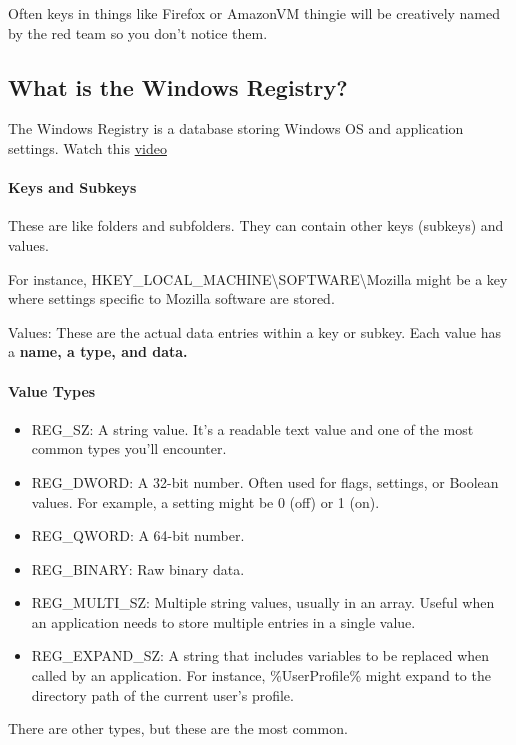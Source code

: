 \documentclass{article}
\begin{document}
Often keys in things like Firefox or AmazonVM thingie will be creatively named by the red team
so you don't notice them.

\subsection{What is the Windows Registry?}
The Windows Registry is a database storing Windows OS and application settings. 
Watch this \href{https://youtu.be/_U78iAem3uo}{video}

\paragraph{Keys and Subkeys}
These are like folders and subfolders. They can contain other keys (subkeys) and values.

\noindent For instance, HKEY\_LOCAL\_MACHINE\textbackslash SOFTWARE\textbackslash Mozilla might be a key where settings specific to Mozilla software are stored.

\noindent Values:
These are the actual data entries within a key or subkey.
Each value has a \textbf{name, a type, and data.}

\paragraph{Value Types}
\begin{itemize}
\item REG\_SZ: A string value. It's a readable text value and one of the most common types
 you'll encounter.

\item REG\_DWORD: A 32-bit number. Often used for flags, settings, or Boolean values. 
For example, a setting might be 0 (off) or 1 (on).

\item REG\_QWORD: A 64-bit number.

\item REG\_BINARY: Raw binary data.

\item REG\_MULTI\_SZ: Multiple string values, usually in an array. 
Useful when an application needs to store multiple entries in a single value.

\item REG\_EXPAND\_SZ: A string that includes variables to be replaced when called by an application. 
For instance, \%UserProfile\% might expand to the directory path of the current user's profile.
\end{itemize}
There are other types, but these are the most common.
\end{document}
